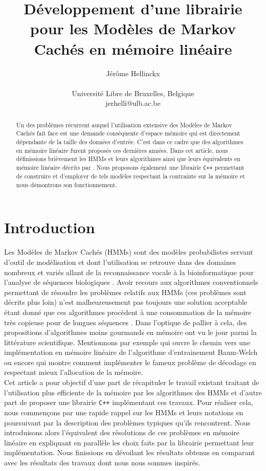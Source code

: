\documentclass[letterpaper]{article}
\title{Développement d'une librairie pour les Modèles de Markov Cachés en mémoire linéaire}
\author{Jérôme Hellinckx \\
\mbox{}\\
Université Libre de Bruxelles, Belgique \\
jerhelli@ulb.ac.be
}
\begin{document}
\renewcommand{\labelitemi}{$\bullet$}

\maketitle

\begin{abstract}
Un des problèmes récurrent auquel l'utilisation extensive des Modèles de Markov Cachés fait face est une demande conséquente d'espace mémoire qui est directement dépendante de la taille des données d'entrée. C'est dans ce cadre que des algorithmes en mémoire linéaire furent proposés ces dernières années. 
Dans cet article, nous définissions brièvement les HMMs et leurs algorithmes ainsi que leurs équivalents en mémoire linéaire décrits par \cite{Ch, LM, MM}. Nous proposons également une librairie \texttt{C++} permettant de construire et d'employer de tels modèles respectant la contrainte sur la mémoire et nous démontrons son fonctionnement.
\end{abstract}

\section{Introduction}
Les Modèles de Markov Cachés (HMMs) sont des modèles probabilistes servant d'outil de modélisation et dont l'utilisation se retrouve dans des domaines nombreux et variés allant de la reconnaissance vocale à la bioinformatique pour l'analyse de séquences biologiques \citep{Intro}. Avoir recours aux algorithmes conventionnels permettant de résoudre les problèmes relatifs aux HMMs (ces problèmes sont décrits plus loin) n'est malheureusement pas toujours une solution acceptable étant donné que ces algorithmes procèdent à une consommation de la mémoire très copieuse pour de longues séquences \citep{Ch}. Dans l'optique de pallier à cela, des propositions d'algorithmes moins gourmands en mémoire ont vu le jour parmi la littérature scientifique. Mentionnons par exemple \cite{MM} qui ouvre le chemin vers une implémentation en mémoire linéaire de l'algorithme d'entrainement Baum-Welch ou encore \cite{Ch} qui montre comment implémenter le fameux problème de décodage en respectant mieux l'allocation de la mémoire. \\

Cet article a pour objectif d'une part de récapituler le travail existant traitant de l'utilisation plus efficiente de la mémoire par les algorithmes des HMMs et d'autre part de proposer une librairie \texttt{C++} implémentant ces travaux. Pour réaliser cela, nous commençons par une rapide rappel sur les HMMs et leurs notations en poursuivant par la description des problèmes typiques qu'ils rencontrent. Nous introduisons alors l'équivalent des résolutions de ces problèmes en mémoire linéaire en expliquant en parallèle les choix faits par la librairie permettant leur implémentation. Nous finissions en dévoilant les résultats obtenus en comparant avec les résultats des travaux dont nous nous sommes inspirés.
 
\end{document}
